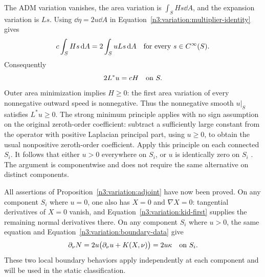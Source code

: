 The ADM variation vanishes, the area variation is
$\int_SHs\dd A$, and the expansion variation is $Ls$.
Using $\dd\eta=2u\dd A$ in
Equation~\eqref{n3:variation:multiplier-identity} gives
\[
 c\int_S Hs\,\mathrm d A=2\int_S uLs\,\mathrm d A
 \quad\hbox{for every }s\in C^\infty(S).
\]
Consequently
\begin{equation}
 2L^*u=cH\quad\hbox{on }S.
 \label{n3:variation:boundary-stability}
\end{equation}
Outer area minimization implies $H\ge0$: the first area variation
of every nonnegative outward speed is nonnegative.  Thus the
nonnegative smooth $u|_S$ satisfies $L^*u\ge0$.  The strong minimum
principle applies with no sign assumption on the original
zeroth-order coefficient: subtract a sufficiently large constant
from the operator with positive Laplacian principal part, using
$u\ge0$, to obtain the usual nonpositive zeroth-order coefficient.
Apply this principle on each connected $S_i$.  It follows that
either $u>0$ everywhere on $S_i$, or $u$ is identically zero on $S_i$
\cite[Chapter 3]{GilbargTrudinger2001}.  The argument is componentwise
and does not require the same alternative on distinct components.

All assertions of Proposition~\ref{n3:variation:adjoint} have now been
proved.  On any component $S_i$ where $u=0$, one also has
$X=0$ and $\nabla X=0$: tangential derivatives of $X=0$ vanish,
and Equation~\eqref{n3:variation:kid-first} supplies the remaining
normal derivatives there.  On any component $S_i$ where $u>0$,
the same equation and Equation~\eqref{n3:variation:boundary-data} give
\[
 \partial_\nu N
   =2u\bigl(\partial_\nu u+K(X,\nu)\bigr)=2u\kappa
   \quad\hbox{on }S_i.
\]
These two local boundary behaviors apply independently at each component
and will be used in the static classification.
